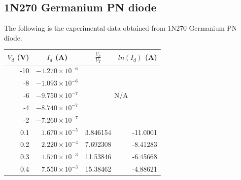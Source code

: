 \documentclass{article}
\begin{document}
\newpage

\subsection*{1N270 Germanium PN diode}
The following is the experimental data obtained from 1N270 Germanium PN diode.
\begin{table}[H]
  \centering
    \begin{tabular}{rrrr}
    \toprule
    \multicolumn{1}{c}{$V_d$ (V)} & \multicolumn{1}{c}{$I_d$ (A)} & \multicolumn{1}{c}{$\frac{V_d}{V_T}$} & \multicolumn{1}{c}{$ln(I_d)$ (A)} \\
    \midrule
    -10   & $-1.270\times10^{-6}$ & \multicolumn{2}{c}{\multirow{5}[0]{*}{N/A}} \\
    -8    & $-1.093\times10^{-6}$ & \multicolumn{2}{c}{} \\
    -6    & $-9.750\times10^{-7}$ & \multicolumn{2}{c}{} \\
    -4    & $-8.740\times10^{-7}$ & \multicolumn{2}{c}{} \\
    -2    & $-7.260\times10^{-7}$ & \multicolumn{2}{c}{} \\
    0.1   & $ 1.670\times10^{-5}$ & 3.846154 & -11.0001 \\
    0.2   & $ 2.220\times10^{-4}$ & 7.692308 & -8.41283 \\
    0.3   & $ 1.570\times10^{-3}$ & 11.53846 & -6.45668 \\
    0.4   & $ 7.550\times10^{-3}$ & 15.38462 & -4.88621 \\
    \bottomrule
  \end{tabular}
\end{table}
\end{document}
